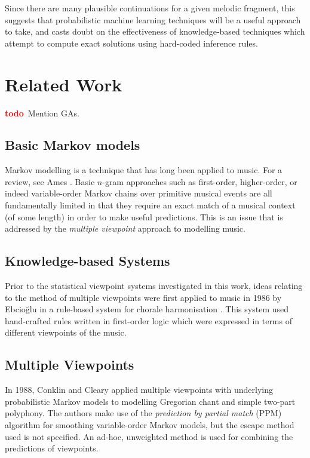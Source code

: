 \documentclass[12pt,a4paper,twoside,openright]{report}
\newcommand{\todo}{\textcolor{red}{\textbf{todo}~}}
\begin{document}
Since there are many plausible continuations for a given melodic fragment, this
suggests that probabilistic machine learning techniques will be a useful
approach to take, and casts doubt on the effectiveness of knowledge-based
techniques which attempt to compute exact solutions using hard-coded inference
rules.

\section{Related Work}

\todo Mention GAs.

\subsection{Basic Markov models}

Markov modelling is a technique that has long been applied to music. For a
review, see Ames \cite{ames1989markov}. Basic $n$-gram approaches such as
first-order, higher-order, or indeed variable-order Markov chains over primitive
musical events are all fundamentally limited in that they require an exact match
of a musical context (of some length) in order to make useful predictions. This
is an issue that is addressed by the \emph{multiple viewpoint} approach to
modelling music.

\subsection{Knowledge-based Systems}

Prior to the statistical viewpoint systems investigated in this work, ideas
relating to the method of multiple viewpoints were first applied to music in
1986 by Ebcioğlu in a rule-based system for chorale harmonisation
\cite{ebcioglu1986expert}.  This system used hand-crafted rules written in
first-order logic which were expressed in terms of different viewpoints of the
music. 

\subsection{Multiple Viewpoints}

In 1988, Conklin and Cleary \cite{conklin1988modelling} applied multiple
viewpoints with underlying probabilistic Markov models to modelling Gregorian
chant and simple two-part polyphony. The authors make use of the
\emph{prediction by partial match} (PPM) algorithm \cite{cleary1984ppm} for
smoothing variable-order Markov models, but the escape method used is not
specified.  An ad-hoc, unweighted method is used for combining the predictions
of viewpoints.
\end{document}
